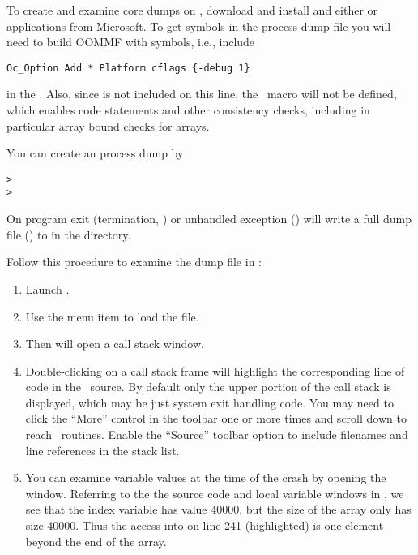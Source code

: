 To create and examine core dumps on \Windows, download and install
 and either  or 
applications from Microsoft. To get symbols in the process dump file you
will need to build OOMMF with symbols, i.e., include
\begin{verbatim}
Oc_Option Add * Platform cflags {-debug 1}
\end{verbatim}
in the . Also, since  is
not included on this line, the \C\ macro  will not be
defined, which enables code  statements and other consistency
checks, including in particular array bound checks for
 arrays.

You can create an  process dump by
\begin{alltt}
> 
> 
\end{alltt}\html{\newline}
On program exit (termination, ) or unhandled exception ()
 will write a full dump file () to
 in the  directory.

Follow this procedure to examine the dump file in :
\begin{enumerate}
\item Launch .
\item Use the menu item  to load the
   file.
\item Then  will open a call stack window.
\item Double-clicking on a call stack frame will highlight the
  corresponding line of code in the \Cplusplus\ source. By default only
  the upper portion of the call stack is displayed, which may be just
  system exit handling code. You may need to click the ``More'' control
  in the toolbar one or more times and scroll down to reach
  \OOMMF\ routines. Enable the ``Source'' toolbar option to include
  filenames and line references in the stack list.
\item You can examine variable values at the time of the crash by
  opening the  window. Referring to the the source code
  and local variable windows in
  ,
  we see that the index variable  has value 40000, but the size of
  the  array only has size 40000. Thus the access into
   on line 241 (highlighted) is one element beyond the
  end of the array.
\end{enumerate}

